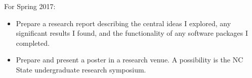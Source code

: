 \documentclass[a4paper,10pt]{article}
\begin{document}
	\noindent
	For Spring 2017:
	\begin{itemize}
		\item Prepare a research report describing the central ideas I explored, any significant results I found, and the functionality of any software packages I completed.
		\item Prepare and present a poster in a research venue.  A possibility is the NC State undergraduate research symposium.
	\end{itemize}


	{\footnotesize
	
	
	}
\end{document}
